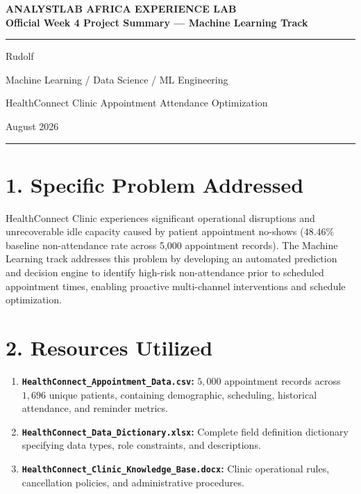 \documentclass[11pt,a4paper]{article}
\begin{document}
\begin{center}
{\Large\bfseries\color{primary} ANALYSTLAB AFRICA EXPERIENCE LAB}\\[0.2cm]
{\large\bfseries\color{secondary} Official Week 4 Project Summary — Machine Learning Track}\\[0.4cm]
\rule{\linewidth}{1pt}
\end{center}

\vspace{0.2cm}

\begin{description}[font=\normalfont\bfseries\color{primary}]
    \item[Intern Name:] Rudolf
    \item[Track:] Machine Learning / Data Science / ML Engineering
    \item[Project Title:] HealthConnect Clinic Appointment Attendance Optimization
    \item[Date:] August 2026
\end{description}

\vspace{0.3cm}
\hrule
\vspace{0.5cm}

\section*{1. Specific Problem Addressed}
HealthConnect Clinic experiences significant operational disruptions and unrecoverable idle capacity caused by patient appointment no-shows ($48.46\%$ baseline non-attendance rate across 5,000 appointment records). The Machine Learning track addresses this problem by developing an automated prediction and decision engine to identify high-risk non-attendance prior to scheduled appointment times, enabling proactive multi-channel interventions and schedule optimization.

\section*{2. Resources Utilized}
\begin{enumerate}
    \item \textbf{\texttt{HealthConnect\_Appointment\_Data.csv}:} $5,000$ appointment records across $1,696$ unique patients, containing demographic, scheduling, historical attendance, and reminder metrics.
    \item \textbf{\texttt{HealthConnect\_Data\_Dictionary.xlsx}:} Complete field definition dictionary specifying data types, role constraints, and descriptions.
    \item \textbf{\texttt{HealthConnect\_Clinic\_Knowledge\_Base.docx}:} Clinic operational rules, cancellation policies, and administrative procedures.
\end{enumerate}
\end{document}
